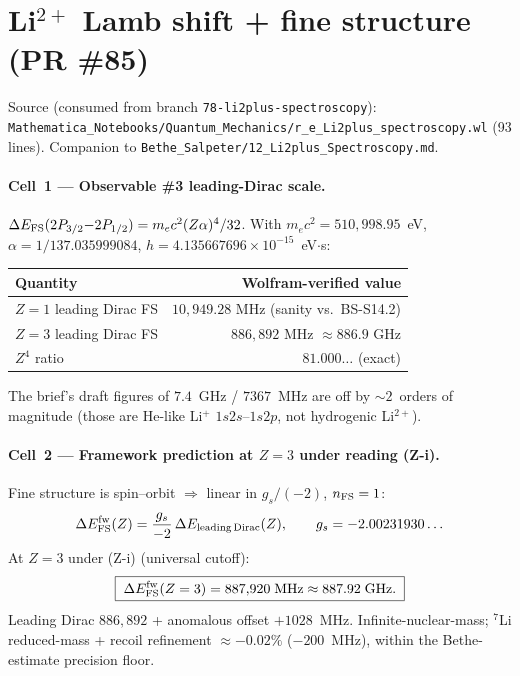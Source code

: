 \section{Li$^{2+}$ Lamb shift + fine structure (PR \#85)}
\label{sec:eq-li2plus-spectroscopy}

Source (consumed from branch \texttt{78-li2plus-spectroscopy}):
\texttt{Mathematica\_Notebooks/Quantum\_Mechanics/r\_e\_Li2plus\_spectroscopy.wl}
(93 lines).
Companion to
\texttt{Bethe\_Salpeter/12\_Li2plus\_Spectroscopy.md}.

\paragraph{Cell~1 --- Observable \#3 leading-Dirac scale.}
$\Delta E_{\rm FS}(2P_{3/2}{-}2P_{1/2}) = m_e c^2 (Z\alpha)^4 / 32$.
With $m_e c^2 = 510{,}998.95$~eV, $\alpha = 1/137.035999084$,
$h = 4.135667696\times 10^{-15}$~eV$\cdot$s:
\begin{center}
\begin{tabular}{lr}
\toprule
Quantity                                 & Wolfram-verified value \\
\midrule
$Z=1$ leading Dirac FS                   & $10{,}949.28$ MHz (sanity vs.~BS-S14.2) \\
$Z=3$ leading Dirac FS                   & $886{,}892$ MHz $\approx 886.9$ GHz \\
$Z^4$ ratio                              & $81.000\dots$ (exact) \\
\bottomrule
\end{tabular}
\end{center}
 The brief's draft figures of $7.4$~GHz /
$7367$~MHz are off by $\sim 2$~orders of magnitude (those are He-like Li$^+$
$1s2s$--$1s2p$, not hydrogenic Li$^{2+}$).

\paragraph{Cell~2 --- Framework prediction at $Z=3$ under reading (Z-i).}
Fine structure is spin--orbit $\Rightarrow$ linear in $g_s/(-2)$, $n_{\rm FS}=1$:
\[
\Delta E_{\rm FS}^{\rm fw}(Z) = \frac{g_s}{-2}\,\Delta E_{\rm leading\,Dirac}(Z),
\qquad g_s = -2.00231930\ldots
\]
At $Z=3$ under (Z-i) (universal cutoff):
\[
\boxed{\;
  \Delta E_{\rm FS}^{\rm fw}(Z=3) = 887{,}920\;\text{MHz} \approx 887.92\;\text{GHz}.
\;}
\]
Leading Dirac $886{,}892$ + anomalous offset $+1028$~MHz. Infinite-nuclear-mass;
$^7$Li reduced-mass + recoil refinement $\approx -0.02\%$ ($-200$~MHz), within
the Bethe-estimate precision floor.

